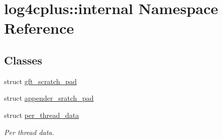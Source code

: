 \hypertarget{namespacelog4cplus_1_1internal}{\section{log4cplus\-:\-:internal Namespace Reference}
\label{namespacelog4cplus_1_1internal}
}
\subsection*{Classes}
\begin{DoxyCompactItemize}
\item 
struct \hyperlink{structlog4cplus_1_1internal_1_1gft__scratch__pad}{gft\-\_\-scratch\-\_\-pad}
\item 
struct \hyperlink{structlog4cplus_1_1internal_1_1appender__sratch__pad}{appender\-\_\-sratch\-\_\-pad}
\item 
struct \hyperlink{structlog4cplus_1_1internal_1_1per__thread__data}{per\-\_\-thread\-\_\-data}
\begin{DoxyCompactList}\small\item\em Per thread data. \end{DoxyCompactList}\end{DoxyCompactItemize}
